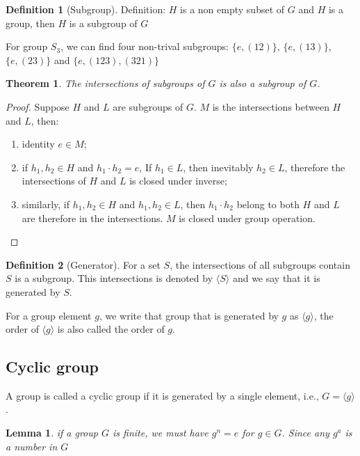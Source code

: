 \documentclass{amsart}
\newtheorem*{theorem}{Theorem}
\newtheorem*{lemma}{Lemma}
\theoremstyle{remark}
\theoremstyle{remark}
\theoremstyle{definition}
\newtheorem*{definition}{Definition}
\begin{document}
\begin{definition}[Subgroup]
    Definition: $H$ is a non empty subset of $G$ and $H$ is a group, then $H$ is a subgroup of $G$
\end{definition}
For group $S_3$, we can find four non-trival subgroups: $\{e, (12)\}$, $\{e, (13)\}$, $\{e, (23)\}$ and $\{e, (123), (321)\}$

\begin{theorem}
    The intersections of subgroups of $G$ is also a subgroup of $G$.
\end{theorem}
\begin{proof}
    Suppose $H$ and $L$ are subgroups of $G$. $M$ is the intersections between $H$ and $L$, then:
    \begin{enumerate}
        \item identity $e \in M$;
        \item if $h_1, h_2 \in H$ and $h_1 \cdot h_2 = e$, If $h_1\in L$, then inevitably $h_2 \in L$, therefore the intersections of $H$ and $L$ is closed under inverse;
        \item similarly, if $h_1, h_2 \in H$ and $h_1, h_2 \in L$, then $h_1\cdot h_2$ belong to both $H$ and $L$ are therefore in the intersections. $M$ is closed under group operation.
    \end{enumerate}
\end{proof}

\begin{definition}[Generator]
    For a set $S$, the intersections of all subgroups contain $S$ is a subgroup. 
    This intersections is denoted by $\langle S\rangle$ and we say that it is generated by $S$. 
\end{definition}


For a group element $g$, we write that group that is generated by $g$ as $\langle g \rangle$, the order of $\langle g \rangle$ is also called the order of $g$. 

\subsection*{Cyclic group}
A group is called a cyclic group if it is generated by a single element, i.e., $G = \langle g \rangle$.

\begin{lemma}
    if a group $G$ is finite, we must have $g^n = e$ for $g \in G$. Since any $g^a$ is a number in $G$
\end{lemma}

\vspace{10pt}
\end{document}
